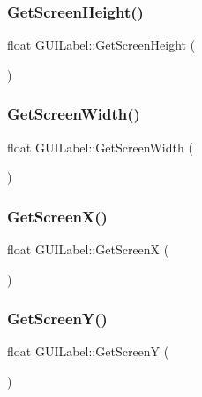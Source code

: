 \hypertarget{class_g_u_i_label_a30ba822a24189efa664fcaaf732f8b3c}{}\label{class_g_u_i_label_a30ba822a24189efa664fcaaf732f8b3c} 
\subsubsection{\texorpdfstring{Get\+Screen\+Height()}{GetScreenHeight()}}
{\footnotesize\ttfamily float G\+U\+I\+Label\+::\+Get\+Screen\+Height (\begin{DoxyParamCaption}{ }\end{DoxyParamCaption})}

\hypertarget{class_g_u_i_label_a6ae950f739faaa5110e6c14b4e90329b}{}\label{class_g_u_i_label_a6ae950f739faaa5110e6c14b4e90329b} 
\subsubsection{\texorpdfstring{Get\+Screen\+Width()}{GetScreenWidth()}}
{\footnotesize\ttfamily float G\+U\+I\+Label\+::\+Get\+Screen\+Width (\begin{DoxyParamCaption}{ }\end{DoxyParamCaption})}

\hypertarget{class_g_u_i_label_ae49955db7b6272e3d8b3828d56ee9efc}{}\label{class_g_u_i_label_ae49955db7b6272e3d8b3828d56ee9efc} 
\subsubsection{\texorpdfstring{Get\+Screen\+X()}{GetScreenX()}}
{\footnotesize\ttfamily float G\+U\+I\+Label\+::\+Get\+ScreenX (\begin{DoxyParamCaption}{ }\end{DoxyParamCaption})}

\hypertarget{class_g_u_i_label_aec3e610535f22d651adff0502e7013db}{}\label{class_g_u_i_label_aec3e610535f22d651adff0502e7013db} 
\subsubsection{\texorpdfstring{Get\+Screen\+Y()}{GetScreenY()}}
{\footnotesize\ttfamily float G\+U\+I\+Label\+::\+Get\+ScreenY (\begin{DoxyParamCaption}{ }\end{DoxyParamCaption})}

